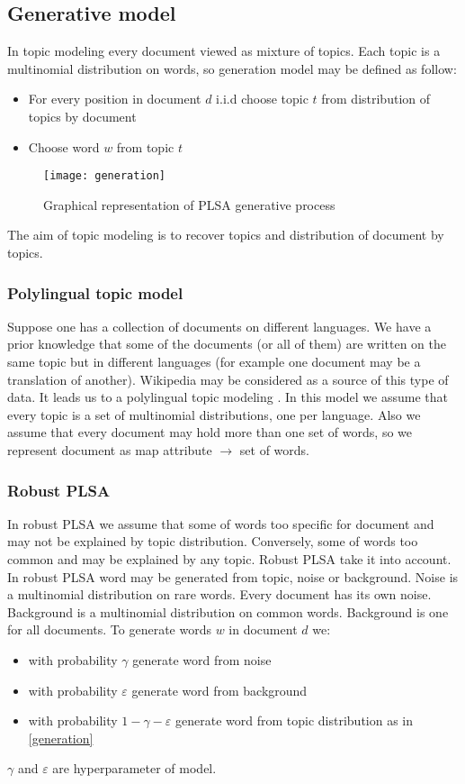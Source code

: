 \subsection{Generative model}
\label{generativeModel}
    In topic modeling every document viewed as mixture of topics. Each topic is a multinomial distribution on words,
    so generation model may be defined as follow:
    \begin{itemize} \label{generation}
	\item For every position in document $d$ i.i.d choose topic $t$ from distribution of topics by document
	\item Choose word $w$ from topic $t$
    \end{itemize}
    \begin{figure}[!ht]
	\caption{Graphical representation of PLSA generative process}
	\begin{minipage}{\textwidth}
	    \texttt{[image: generation]}
	\end{minipage}
    \end{figure}
    The aim of topic modeling is to recover topics and distribution of document by topics.
    \subsubsection{Polylingual topic model}
	Suppose one has a collection of documents on different languages. We have a prior knowledge that some of the
	documents (or all of them) are written on the same topic but in different languages (for example one document may be a translation of another).
	Wikipedia may be considered as a source of this type of data. It leads us to a polylingual topic modeling \cite{polylingual}.
	In this model we assume that every topic is a set of multinomial distributions, one per language. Also we assume that
	every document may hold more than one set of words, so we represent document as map attribute $\to$ set of words.

    \subsubsection{Robust PLSA}
	In robust PLSA we assume that some of words too specific for document and may not be explained by topic
	distribution. Conversely, some of words too common and may be explained by any topic.
	Robust PLSA take it into account. In robust PLSA word may be generated from topic, noise or background.
	Noise is a multinomial distribution on rare words. Every document has its own noise.
	Background is a multinomial distribution on common words. Background is one for all documents.
	To generate words $w$  in document $d$ we:
	\begin{itemize}
	    \item with probability $\gamma$ generate word from noise
	    \item with probability $\varepsilon$ generate word from background
	    \item with probability $1 - \gamma - \varepsilon$ generate word from topic
		distribution as in \ref{generation}
	\end{itemize}
	$\gamma$ and $\varepsilon$ are hyperparameter of model.

